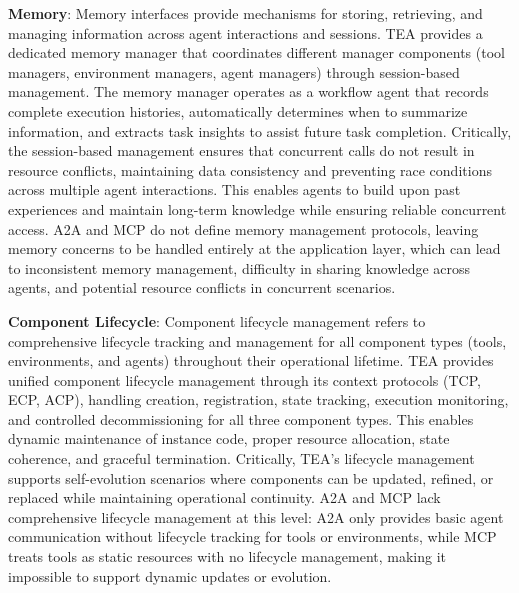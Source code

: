 \documentclass[11pt]{article}
\begin{document}
\textbf{Memory}: Memory interfaces provide mechanisms for storing, retrieving, and managing information across agent interactions and sessions. TEA provides a dedicated memory manager that coordinates different manager components (tool managers, environment managers, agent managers) through session-based management. The memory manager operates as a workflow agent that records complete execution histories, automatically determines when to summarize information, and extracts task insights to assist future task completion. Critically, the session-based management ensures that concurrent calls do not result in resource conflicts, maintaining data consistency and preventing race conditions across multiple agent interactions. This enables agents to build upon past experiences and maintain long-term knowledge while ensuring reliable concurrent access. A2A and MCP do not define memory management protocols, leaving memory concerns to be handled entirely at the application layer, which can lead to inconsistent memory management, difficulty in sharing knowledge across agents, and potential resource conflicts in concurrent scenarios.

\textbf{Component Lifecycle}: Component lifecycle management refers to comprehensive lifecycle tracking and management for all component types (tools, environments, and agents) throughout their operational lifetime. TEA provides unified component lifecycle management through its context protocols (TCP, ECP, ACP), handling creation, registration, state tracking, execution monitoring, and controlled decommissioning for all three component types. This enables dynamic maintenance of instance code, proper resource allocation, state coherence, and graceful termination. Critically, TEA's lifecycle management supports self-evolution scenarios where components can be updated, refined, or replaced while maintaining operational continuity. A2A and MCP lack comprehensive lifecycle management at this level: A2A only provides basic agent communication without lifecycle tracking for tools or environments, while MCP treats tools as static resources with no lifecycle management, making it impossible to support dynamic updates or evolution.
\end{document}
